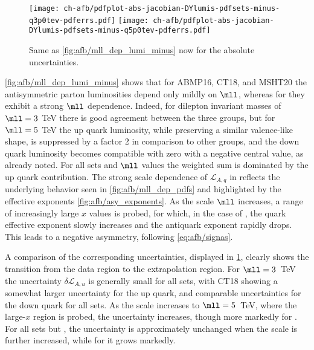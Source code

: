 \begin{figure}[!t]
 \centering
 \texttt{[image: ch-afb/pdfplot-abs-jacobian-DYlumis-pdfsets-minus-q3p0tev-pdferrs.pdf]}
 \texttt{[image: ch-afb/pdfplot-abs-jacobian-DYlumis-pdfsets-minus-q5p0tev-pdferrs.pdf]}
 \caption{Same as \cref{fig:afb/mll_dep_lumi_minus} now for the absolute \pdf uncertainties.
    }    
 \label{fig:afb/mll_dep_lumi_minus_pdferrs}
\end{figure}

\cref{fig:afb/mll_dep_lumi_minus} shows that for ABMP16, CT18, and
MSHT20 the antisymmetric
parton luminosities depend only mildly on $\mll$, whereas for 
they exhibit a strong $\mll$ dependence.
%
Indeed, for dilepton invariant masses of $\mll=3$ TeV there is good
agreement between the three groups, but
for $\mll=5$ TeV the  up quark luminosity, while preserving a
similar valence-like shape, is suppressed
by a factor 2 in comparison  to other groups, and the down quark luminosity becomes compatible with zero with a negative
central value,  as already noted. 
%
For all \pdf sets and  $\mll$ values the weighted sum is dominated by the up quark contribution.
The strong scale dependence of $\mathcal{L}_{A,q}$ in 
reflects the underlying \pdf behavior seen in  \cref{fig:afb/mll_dep_pdfs}
and highlighted by the effective exponents \cref{fig:afb/asy_exponents}.
%
As the scale $\mll$ increases, a range of increasingly large $x$ values is probed,
for which, in the case of
, the quark effective exponent slowly increases and the
antiquark exponent rapidly drops.
%
This leads to a negative asymmetry, 
following  \cref{eq:afb/signas}. 

A comparison of the corresponding \pdf uncertainties, displayed in
\cref{fig:afb/mll_dep_lumi_minus_pdferrs}, clearly shows the transition
from the data region to the extrapolation region.
%
For
$\mll=3$~TeV the uncertainty $\delta \mathcal{L}_{A,u}$ is generally
small for all sets, with CT18
showing a somewhat larger uncertainty for the up quark, and comparable
uncertainties for the down quark for all \pdf sets.
%
As the scale  increases to $\mll=5$~TeV, where the large-$x$ region is
probed,  the uncertainty 
increases, though more markedly for .
%
For all \pdf sets but
, the
uncertainty is approximately unchanged when the scale is further increased,
while for  it grows markedly.

